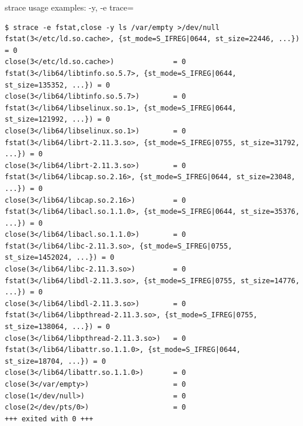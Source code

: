 \documentclass[unicode,aspectratio=169]{beamer}
\begin{document}
\begin{frame}[fragile]{strace usage examples: -y, -e trace=}
\tiny
\begin{verbatim}
$ strace -e fstat,close -y ls /var/empty >/dev/null
fstat(3</etc/ld.so.cache>, {st_mode=S_IFREG|0644, st_size=22446, ...}) = 0
close(3</etc/ld.so.cache>)              = 0
fstat(3</lib64/libtinfo.so.5.7>, {st_mode=S_IFREG|0644, st_size=135352, ...}) = 0
close(3</lib64/libtinfo.so.5.7>)        = 0
fstat(3</lib64/libselinux.so.1>, {st_mode=S_IFREG|0644, st_size=121992, ...}) = 0
close(3</lib64/libselinux.so.1>)        = 0
fstat(3</lib64/librt-2.11.3.so>, {st_mode=S_IFREG|0755, st_size=31792, ...}) = 0
close(3</lib64/librt-2.11.3.so>)        = 0
fstat(3</lib64/libcap.so.2.16>, {st_mode=S_IFREG|0644, st_size=23048, ...}) = 0
close(3</lib64/libcap.so.2.16>)         = 0
fstat(3</lib64/libacl.so.1.1.0>, {st_mode=S_IFREG|0644, st_size=35376, ...}) = 0
close(3</lib64/libacl.so.1.1.0>)        = 0
fstat(3</lib64/libc-2.11.3.so>, {st_mode=S_IFREG|0755, st_size=1452024, ...}) = 0
close(3</lib64/libc-2.11.3.so>)         = 0
fstat(3</lib64/libdl-2.11.3.so>, {st_mode=S_IFREG|0755, st_size=14776, ...}) = 0
close(3</lib64/libdl-2.11.3.so>)        = 0
fstat(3</lib64/libpthread-2.11.3.so>, {st_mode=S_IFREG|0755, st_size=138064, ...}) = 0
close(3</lib64/libpthread-2.11.3.so>)   = 0
fstat(3</lib64/libattr.so.1.1.0>, {st_mode=S_IFREG|0644, st_size=18704, ...}) = 0
close(3</lib64/libattr.so.1.1.0>)       = 0
close(3</var/empty>)                    = 0
close(1</dev/null>)                     = 0
close(2</dev/pts/0>)                    = 0
+++ exited with 0 +++
\end{verbatim}
\end{frame}
\end{document}
